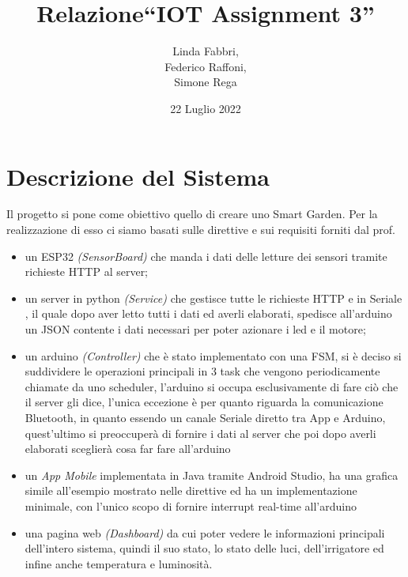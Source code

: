 \documentclass[a4paper,12pt]{report}
\title{Relazione\break``IOT Assignment 3''}
\author{Linda Fabbri, \\ Federico Raffoni,\\ Simone Rega}
\date{22 Luglio 2022}
\begin{document}
	\maketitle
	\tableofcontents
	
	\chapter{Descrizione del Sistema}
		Il progetto si pone come obiettivo quello di creare uno Smart Garden.
		Per la realizzazione di esso ci siamo basati sulle direttive e sui requisiti forniti dal prof.
	\begin{itemize}
		\item 	un ESP32 \textit{(SensorBoard)} che manda i dati delle letture dei sensori tramite richieste HTTP al server;
		\item  un server in python \textit{(Service)} che gestisce tutte le richieste HTTP e in Seriale , il quale dopo aver letto tutti i dati ed averli elaborati, spedisce all'arduino un JSON contente i dati necessari per poter azionare i led e il motore;
		\item un arduino \textit{(Controller)} che è stato implementato con una FSM, si è deciso si suddividere le operazioni principali in 3 task che vengono periodicamente chiamate da uno scheduler, l'arduino si occupa esclusivamente di  fare ciò che il server gli dice, l'unica eccezione è per quanto riguarda la comunicazione Bluetooth, in quanto essendo un canale Seriale diretto tra App e Arduino, quest'ultimo si preoccuperà di fornire i dati al server che poi dopo averli elaborati sceglierà cosa far fare all'arduino
		\item 	un \textit{App Mobile} implementata in Java tramite Android Studio, ha una grafica simile all'esempio mostrato nelle direttive ed ha un implementazione minimale, con l'unico scopo di fornire interrupt real-time all'arduino
		\item una pagina web \textit{(Dashboard)} da cui poter vedere le informazioni principali dell'intero sistema, quindi il suo stato, lo stato delle luci, dell'irrigatore ed infine anche temperatura e luminosità.
	\end{itemize}
\end{document}
